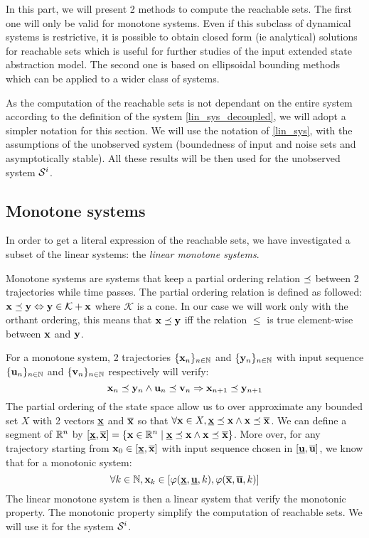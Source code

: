 In this part, we will present 2 methods to compute the reachable sets.
The first one will only be valid for monotone systems. Even if this subclass of dynamical systems is restrictive, it is possible to obtain closed form (ie analytical) solutions for reachable sets which is useful for further studies of the input extended state abstraction model.
The second one is based on ellipsoidal bounding methods which can be applied to a wider class of systems.


As the computation of the reachable sets is not dependant on the entire system according to the definition of the system \ref{lin_sys_decoupled}, we will adopt a simpler notation for this section.
We will use the notation of \ref{lin_sys}, with the assumptions of the unobserved system (boundedness of input and noise sets and asymptotically stable).
All these results will be then used for the unobserved system $\mathcal{S}^i$.

\subsection{Monotone systems}
In order to get a literal expression of the reachable sets, we have investigated a subset of the linear systems: the \textit{linear monotone systems}.

\newcommand{\N}{\mathbb{N}}
Monotone systems are systems that keep a partial ordering relation $\preceq$ between 2 trajectories while time passes.
The partial ordering relation is defined as followed: $ \mathbf{x} \preceq  \mathbf{y} \Leftrightarrow  \mathbf{y} \in \mathcal{K} +  \mathbf{x}$ where $\mathcal{K}$ is a cone. In our case we will work only with the orthant ordering, this means that $ \mathbf{x} \preceq  \mathbf{y}$ iff the relation $\leq$ is true element-wise between $ \mathbf{x}$ and $ \mathbf{y}$.

For a monotone system, 2 trajectories $\{\x_n\}_{n \in \N}$ and $\{\y_n\}_{n \in \N}$ with input sequence $\{\u_n\}_{n \in \N}$ and $\{\v_n\}_{n \in \N}$ respectively will verify:
\begin{equation}
 \mathbf{x}_n \preceq  \mathbf{y}_n \wedge
 \mathbf{u}_n \preceq  \mathbf{v}_n 
\Rightarrow 
 \mathbf{x}_{n+1} \preceq  \mathbf{y}_{n+1}
\end{equation}
The partial ordering of the state space allow us to over approximate any bounded set $X$ with 2 vectors $\underline{ \mathbf{x}}$ and $\overline{ \mathbf{x}}$ so that $\forall  \mathbf{x} \in X, \underline{ \mathbf{x}} \preceq  \mathbf{x} \wedge  \mathbf{x} \preceq \overline{ \mathbf{x}}$. We can define a segment of $\mathbb{R}^n$ by $[\underline{ \mathbf{x}},\overline{ \mathbf{x}}] = \{ \mathbf{x} \in \mathbb{R}^n \mid  \underline{ \mathbf{x}} \preceq  \mathbf{x} \wedge  \mathbf{x} \preceq \overline{ \mathbf{x}}\}$.
More over, for any trajectory starting from $ \mathbf{x}_0 \in [\underline{ \mathbf{x}},\overline{ \mathbf{x}}]$ with input sequence chosen in $[\underline{ \mathbf{u}},\overline{ \mathbf{u}}]$, we know that for a monotonic system:
\begin{equation}
\forall k \in \mathbb{N},  \mathbf{x}_k \in [\varphi(\underline{ \mathbf{x}},\underline{ \mathbf{u}},k),\varphi(\overline{ \mathbf{x}},\overline{ \mathbf{u}},k)]
\end{equation}
The linear monotone system is then a linear system that verify the monotonic property.
The monotonic property simplify the computation of reachable sets. We will use it for the system $\mathcal{S}^i$.

